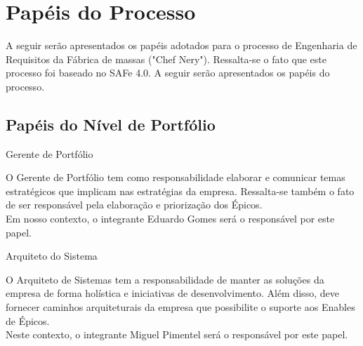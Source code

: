 {
    \large{\section {Papéis do Processo\\} }

    \tab A seguir serão apresentados os papéis adotados para o processo de Engenharia de Requisitos da Fábrica de massas ("Chef Nery"). Ressalta-se o fato que este processo foi baseado no SAFe 4.0. A seguir serão apresentados os papéis do processo.\\

}


{\large{\subsection {Papéis do Nível de Portfólio\\} } }

\begin{itemize}


{
    \large{\item {Gerente de Portfólio\\} }

    \tab O Gerente de Portfólio tem como responsabilidade elaborar e comunicar temas estratégicos que implicam nas estratégias da empresa. Ressalta-se também o fato de ser responsável pela elaboração e priorização dos Épicos. \\
    \tab Em nosso contexto, o integrante Eduardo Gomes será o responsável por este papel. \\
}


{
    \large{\item {Arquiteto do Sistema\\} }

    \tab O Arquiteto de Sistemas tem a responsabilidade de manter as soluções da empresa de forma holística e iniciativas de desenvolvimento. Além disso, deve fornecer caminhos arquiteturais da empresa que possibilite o suporte aos Enables de Épicos. \\
    \tab Neste contexto, o integrante Miguel Pimentel será o responsável por este papel. \\
}

\end{itemize}

